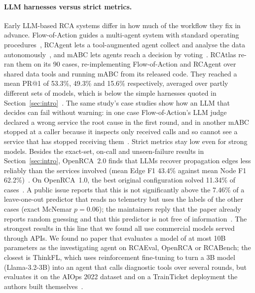 \paragraph{LLM harnesses versus strict metrics.}
Early LLM-based RCA systems differ in how much of the workflow they fix in advance. Flow-of-Action guides a multi-agent system with standard operating procedures~\cite{flowofaction2025}, RCAgent lets a tool-augmented agent collect and analyse the data autonomously~\cite{rcagent}, and mABC lets agents reach a decision by voting~\cite{mabc2024}.
RCAtlas re-ran them on its 90 cases, re-implementing Flow-of-Action and RCAgent over shared data tools and running mABC from its released code. They reached a mean PR@1 of 53.3\%, 49.3\% and 15.6\% respectively, averaged over partly different sets of models, which is below the simple harnesses quoted in Section~\ref{sec:intro}~\cite{rcatlas2026}.
The same study's case studies show how an LLM that decides can fail without warning: in one case Flow-of-Action's LLM judge declared a wrong service the root cause in the first round, and in another mABC stopped at a caller because it inspects only received calls and so cannot see a service that has stopped receiving them~\cite{rcatlas2026}.
Strict metrics stay low even for strong models.
Besides the exact-set, on-call and unseen-failure results in Section~\ref{sec:intro}, OpenRCA~2.0 finds that LLMs recover propagation edges less reliably than the services involved (mean Edge F1 43.4\% against mean Node F1 62.2\%)~\cite{openrca2026v2}.
On OpenRCA~1.0, the best original configuration solved 11.34\% of cases~\cite{openrca2025}. A public issue reports that this is not significantly above the 7.46\% of a leave-one-out predictor that reads no telemetry but uses the labels of the other cases (exact McNemar $p = 0.06$); the maintainers reply that the paper already reports random guessing and that this predictor is not free of information~\cite{openrcaissue23}.
The strongest results in this line that we found all use commercial models served through APIs.
We found no paper that evaluates a model of at most 10B parameters as the investigating agent on RCAEval, OpenRCA or RCABench; the closest is ThinkFL, which uses reinforcement fine-tuning to turn a 3B model (Llama-3.2-3B) into an agent that calls diagnostic tools over several rounds, but evaluates it on the AIOps 2022 dataset and on a TrainTicket deployment the authors built themselves~\cite{thinkfl}.

